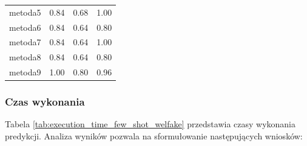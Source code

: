 \begin{table}[H]
\begin{tabular}{lccc}
		metoda5           & 0.84          & 0.68             & 1.00           \\
		metoda6           & 0.84          & 0.64             & 0.80           \\
		metoda7           & 0.84          & 0.64             & 1.00           \\
		metoda8           & 0.84          & 0.64             & 0.80           \\
		metoda9           & 1.00          & 0.80             & 0.96           \\
		\bottomrule
	\end{tabular}
\end{table}

\subsubsection{Czas wykonania}
Tabela \ref{tab:execution_time_few_shot_welfake} przedstawia czasy wykonania predykcji. Analiza wyników pozwala na sformułowanie następujących wniosków:


